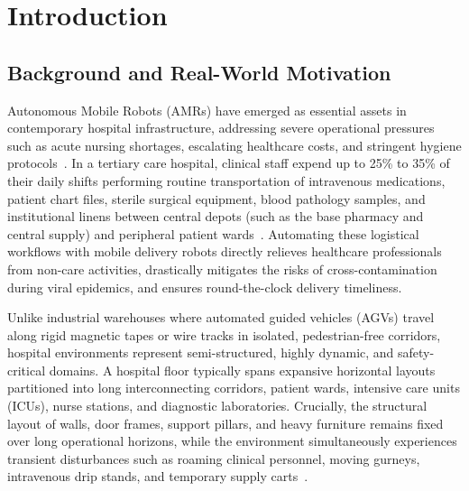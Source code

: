 \documentclass[12pt,a4paper]{article}
\begin{document}
\setcounter{page}{1}

\section{Introduction}

\subsection{Background and Real-World Motivation}
Autonomous Mobile Robots (AMRs) have emerged as essential assets in contemporary hospital infrastructure, addressing severe operational pressures such as acute nursing shortages, escalating healthcare costs, and stringent hygiene protocols~\cite{rohde2019}. In a tertiary care hospital, clinical staff expend up to 25\% to 35\% of their daily shifts performing routine transportation of intravenous medications, patient chart files, sterile surgical equipment, blood pathology samples, and institutional linens between central depots (such as the base pharmacy and central supply) and peripheral patient wards~\cite{siciliano2016}. Automating these logistical workflows with mobile delivery robots directly relieves healthcare professionals from non-care activities, drastically mitigates the risks of cross-contamination during viral epidemics, and ensures round-the-clock delivery timeliness.

Unlike industrial warehouses where automated guided vehicles (AGVs) travel along rigid magnetic tapes or wire tracks in isolated, pedestrian-free corridors, hospital environments represent semi-structured, highly dynamic, and safety-critical domains. A hospital floor typically spans expansive horizontal layouts partitioned into long interconnecting corridors, patient wards, intensive care units (ICUs), nurse stations, and diagnostic laboratories. Crucially, the structural layout of walls, door frames, support pillars, and heavy furniture remains fixed over long operational horizons, while the environment simultaneously experiences transient disturbances such as roaming clinical personnel, moving gurneys, intravenous drip stands, and temporary supply carts~\cite{thrun2005}.
\end{document}
